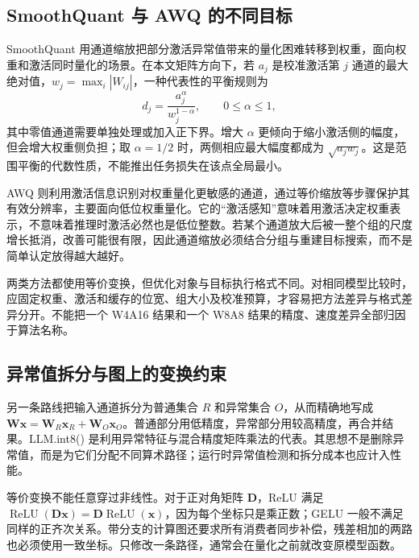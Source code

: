\documentclass[UTF8,12pt,a4paper,fontset=fandol]{ctexart}
\begin{document}
\subsection{SmoothQuant 与 AWQ 的不同目标}
SmoothQuant 用通道缩放把部分激活异常值带来的量化困难转移到权重，面向权重和激活同时量化的场景\cite{xiao2023}。在本文矩阵方向下，若 $a_j$ 是校准激活第 $j$ 通道的最大绝对值，$w_j=\max_i|W_{ij}|$，一种代表性的平衡规则为
\begin{equation}
 d_j=\frac{a_j^\alpha}{w_j^{1-\alpha}},\qquad 0\leq\alpha\leq1,
 \label{eq:quant-smooth-scale}
\end{equation}
其中零值通道需要单独处理或加入正下界。增大 $\alpha$ 更倾向于缩小激活侧的幅度，但会增大权重侧负担；取 $\alpha=1/2$ 时，两侧相应最大幅度都成为 $\sqrt{a_jw_j}$。这是范围平衡的代数性质，不能推出任务损失在该点全局最小。

AWQ 则利用激活信息识别对权重量化更敏感的通道，通过等价缩放等步骤保护其有效分辨率，主要面向低位权重量化\cite{lin2024}。它的“激活感知”意味着用激活决定权重表示，不意味着推理时激活必然也是低位整数。若某个通道放大后被一整个组的尺度增长抵消，改善可能很有限，因此通道缩放必须结合分组与重建目标搜索，而不是简单认定放得越大越好。

两类方法都使用等价变换，但优化对象与目标执行格式不同。对相同模型比较时，应固定权重、激活和缓存的位宽、组大小及校准预算，才容易把方法差异与格式差异分开。不能把一个 W4A16 结果和一个 W8A8 结果的精度、速度差异全部归因于算法名称。

\subsection{异常值拆分与图上的变换约束}
另一条路线把输入通道拆分为普通集合 $R$ 和异常集合 $O$，从而精确地写成 $\mathbf W\mathbf x=\mathbf W_R\mathbf x_R+\mathbf W_O\mathbf x_O$。普通部分用低精度，异常部分用较高精度，再合并结果。LLM.int8() 是利用异常特征与混合精度矩阵乘法的代表\cite{dettmers2022}。其思想不是删除异常值，而是为它们分配不同算术路径；运行时异常值检测和拆分成本也应计入性能。

等价变换不能任意穿过非线性。对于正对角矩阵 $\mathbf D$，ReLU 满足 $\operatorname{ReLU}(\mathbf D\mathbf x)=\mathbf D\operatorname{ReLU}(\mathbf x)$，因为每个坐标只是乘正数；GELU 一般不满足同样的正齐次关系。带分支的计算图还要求所有消费者同步补偿，残差相加的两路也必须使用一致坐标。只修改一条路径，通常会在量化之前就改变原模型函数。
\end{document}
